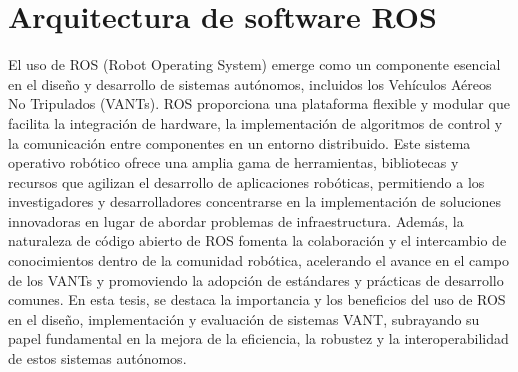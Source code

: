 \section{Arquitectura de software ROS}

El uso de ROS (Robot Operating System) emerge como un componente esencial en el diseño y desarrollo de sistemas autónomos, incluidos los Vehículos Aéreos No Tripulados (VANTs). ROS proporciona una plataforma flexible y modular que facilita la integración de hardware, la implementación de algoritmos de control y la comunicación entre componentes en un entorno distribuido. Este sistema operativo robótico ofrece una amplia gama de herramientas, bibliotecas y recursos que agilizan el desarrollo de aplicaciones robóticas, permitiendo a los investigadores y desarrolladores concentrarse en la implementación de soluciones innovadoras en lugar de abordar problemas de infraestructura. Además, la naturaleza de código abierto de ROS fomenta la colaboración y el intercambio de conocimientos dentro de la comunidad robótica, acelerando el avance en el campo de los VANTs y promoviendo la adopción de estándares y prácticas de desarrollo comunes. En esta tesis, se destaca la importancia y los beneficios del uso de ROS en el diseño, implementación y evaluación de sistemas VANT, subrayando su papel fundamental en la mejora de la eficiencia, la robustez y la interoperabilidad de estos sistemas autónomos.
